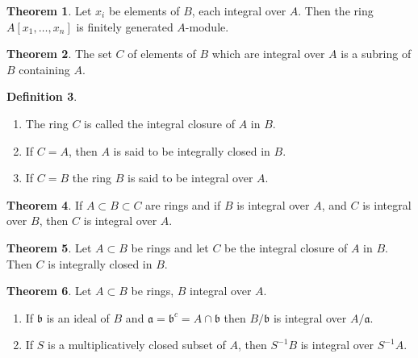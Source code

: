 \documentclass[a4paper]{book}
\theoremstyle{definition}
\newtheorem{definition}{Definition}[]
\newtheorem{theorem}[definition]{Theorem}
\begin{document}
\begin{thmbox}
    \begin{theorem}
        Let \(x_i\) be elements of \(B\), each integral over \(A\). Then the ring \(A[x_1, \ldots, x_n]\) is finitely generated \(A\)-module.
    \end{theorem}
\end{thmbox}

\begin{thmbox}
    \begin{theorem}
        The set \(C\) of elements of \(B\) which are integral over \(A\) is a subring of \(B\) containing \(A\).
    \end{theorem}
\end{thmbox}

\begin{defbox}
    \begin{definition}
        \begin{enumerate}
            \item The ring \(C\) is called the integral closure of \(A\) in \(B\).
            \item If \(C = A\), then \(A\) is said to be integrally closed in \(B\).
            \item If \(C = B\) the ring \(B\) is said to be integral over \(A\).
        \end{enumerate}
    \end{definition}
\end{defbox}

\begin{thmbox}
    \begin{theorem}
        If \(A \subset B \subset C\) are rings and if \(B\) is integral over \(A\), and \(C\) is integral over \(B\), then \(C\) is integral over \(A\).
    \end{theorem}
\end{thmbox}

\begin{thmbox}
    \begin{theorem}
        Let \(A \subset B\) be rings and let \(C\) be the integral closure of \(A\) in \(B\). Then \(C\) is integrally closed in \(B\).
    \end{theorem}
\end{thmbox}


\begin{thmbox}
    \begin{theorem}
        Let \(A \subset B\) be rings, \(B\) integral over \(A\).
        \begin{enumerate}
            \item If \(\mathfrak{b}\) is an ideal of \(B\) and \(\mathfrak{a} = \mathfrak{b}^c = A \cap \mathfrak{b}\) then \(B / \mathfrak{b}\) is integral over \(A / \mathfrak{a}\).
            \item If \(S\) is a multiplicatively closed subset of \(A\), then \(S^{-1}B\) is integral over \(S^{-1}A\).
        \end{enumerate}
    \end{theorem}
\end{thmbox}
\end{document}
